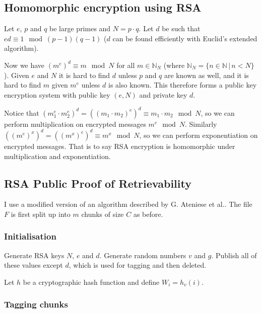 \documentclass[12pt,a4paper,twoside,openright]{report}
\begin{document}
\subsection{Homomorphic encryption using RSA}

Let $e$, $p$ and $q$ be large primes and $N = p \cdot q$.
Let $d$ be such that $e d \equiv 1 \mod (p-1)(q-1)$ ($d$ can be found efficiently with Euclid's extended algorithm).

Now we have $(m^e)^d \equiv m \mod N$ for all $m \in \mathbb{N}_N$  (where $\mathbb{N}_N = \{n \in \mathbb{N} \,|\, n < N\}$).
Given $e$ and $N$ it is hard to find $d$ unless $p$ and $q$ are known as well,
and it is hard to find $m$ given $m^e$ unless $d$ is also known.
This therefore forms a public key encryption system with public key $(e, N)$ and private key $d$.

Notice that $(m_1^e \cdot m_2^e)^d = \left((m_1 \cdot m_2)^e\right)^d \equiv m_1 \cdot m_2 \mod N$, so we can perform multiplication on
encrypted messages $m^e \mod N$.
Similarly $\left(\left(m^e\right)^x\right)^d = \left(\left(m^x\right)^e\right)^d \equiv m^x \mod N$, so we can perform exponentiation on encrypted messages.
That is to say RSA encryption is homomorphic under multiplication and exponentiation.

\subsection{RSA Public Proof of Retrievability}

I use a modified version of an algorithm described by G. Ateniese et al.\cite{rsa-por}.
The file $F$ is first split up into $m$ chunks of size $C$ as before.


\subsubsection{Initialisation}

Generate RSA keys $N$, $e$ and $d$.
Generate random numbers $v$ and $g$.
Publish all of these values except $d$, which is used for tagging and then deleted.

Let $h$ be a cryptographic hash function and define
$W_i = h_v(i)$.

\subsubsection{Tagging chunks}
\end{document}
